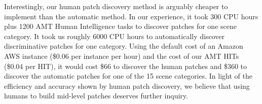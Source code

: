 \documentclass[10pt,twocolumn,letterpaper]{article}
\begin{document}


Interestingly, our human patch discovery method is arguably cheaper to implement than the automatic method. In our experience, it took 300 CPU hours plus 1200 AMT Human Intelligence tasks to discover patches for one scene category. It took us roughly 6000 CPU hours to automatically discover discriminative patches for one category. Using the default cost of an Amazon AWS instance (\$0.06 per instance per hour) and the cost of our AMT HITs (\$0.04 per HIT), it would cost \$66 to discover the human patches and \$360 to discover the automatic patches for one of the 15 scene categories. In light of the efficiency and accuracy shown by human patch discovery, we believe that using humans to build mid-level patches deserves further inquiry.


{\footnotesize


}
\end{document}
